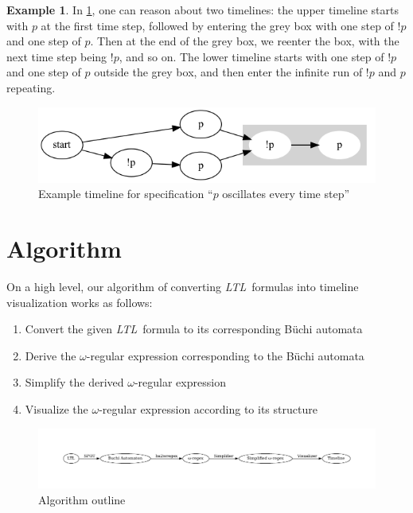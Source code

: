 \documentclass[preprint,12pt]{elsarticle}
\theoremstyle{definition}
\newtheorem{example}{Example}[section]
\theoremstyle{remark}
\newcommand{\ltl}{\textit{LTL}}
\newcommand{\Buchi}{B\"{u}chi }
\begin{document}
\begin{example}
    In \cref{fig:ex2}, one can reason about two timelines: the upper timeline starts with $p$ at the first time step, followed by entering the grey box with one step of $!p$ and one step of $p$. Then at the end of the grey box, we reenter the box, with the next time step being $!p$, and so on. The lower timeline starts with one step of $!p$ and one step of $p$ outside the grey box, and then enter the infinite run of $!p$ and $p$ repeating.
    \begin{figure}[!h]
        \centering
        \includegraphics[scale=0.4]{examples/ex2/ex2.png}
        \caption{Example timeline for specification ``$p$ oscillates every time step''}
        \label{fig:ex2}
    \end{figure}
\end{example}

\section{Algorithm}
On a high level, our algorithm of converting \ltl\ formulas into timeline visualization works as follows:
\begin{enumerate}
    \item Convert the given \ltl\ formula to its corresponding \Buchi automata %
    \item Derive the $\omega$-regular expression corresponding to the \Buchi automata %
    \item Simplify the derived $\omega$-regular expression %
    \item Visualize the $\omega$-regular expression according to its structure %
\end{enumerate}
\begin{figure}[!h]
    \centering
    \includegraphics[width=\textwidth, trim=1cm 3cm 1cm 3cm, clip]{img/algorithm_outline.pdf}
    \caption{Algorithm outline}
    \label{fig:algo}
\end{figure}
\end{document}
